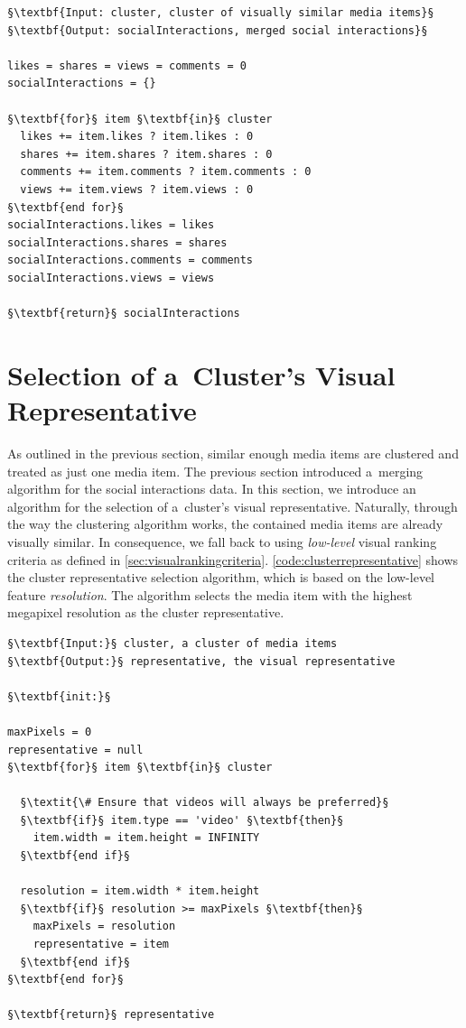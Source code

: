 \begin{lstlisting}[caption=The social interactions merging algorithm,
  label=code:merging, float=b!, escapechar=§]
§\textbf{Input: cluster, cluster of visually similar media items}§ 
§\textbf{Output: socialInteractions, merged social interactions}§ 

likes = shares = views = comments = 0
socialInteractions = {}

§\textbf{for}§ item §\textbf{in}§ cluster
  likes += item.likes ? item.likes : 0
  shares += item.shares ? item.shares : 0
  comments += item.comments ? item.comments : 0
  views += item.views ? item.views : 0
§\textbf{end for}§
socialInteractions.likes = likes
socialInteractions.shares = shares
socialInteractions.comments = comments
socialInteractions.views = views

§\textbf{return}§ socialInteractions
\end{lstlisting}

\section{Selection of a~Cluster's Visual Representative}  

As outlined in the previous section, similar enough media items
are clustered and treated as just one media item.
The previous section introduced
a~merging algorithm for the social interactions data.
In this section, we introduce an algorithm for the selection of
a~cluster's visual representative.
Naturally, through the way the clustering algorithm works,
the contained media items are already visually similar. 
In consequence, we fall back to using \emph{low-level}
visual ranking criteria as defined in \autoref{sec:visualrankingcriteria}.
\autoref{code:clusterrepresentative} shows the cluster representative
selection algorithm, which is based on the low-level feature \emph{resolution}.
The algorithm selects the media item with the highest megapixel resolution
as the cluster representative.

\begin{lstlisting}[caption=Pseudocode of the cluster visual representative selection algorithm that finds the highest quality media item of a~cluster,
  label=code:clusterrepresentative, float, escapechar=§]
§\textbf{Input:}§ cluster, a cluster of media items
§\textbf{Output:}§ representative, the visual representative

§\textbf{init:}§
  
maxPixels = 0
representative = null
§\textbf{for}§ item §\textbf{in}§ cluster
  
  §\textit{\# Ensure that videos will always be preferred}§  
  §\textbf{if}§ item.type == 'video' §\textbf{then}§
    item.width = item.height = INFINITY
  §\textbf{end if}§ 
    
  resolution = item.width * item.height
  §\textbf{if}§ resolution >= maxPixels §\textbf{then}§
    maxPixels = resolution
    representative = item
  §\textbf{end if}§  
§\textbf{end for}§

§\textbf{return}§ representative     
\end{lstlisting}


